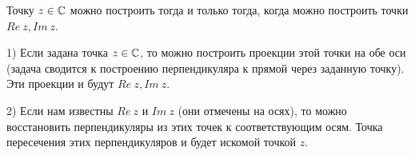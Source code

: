 Точку $z \in \mathbb{C}$ можно построить тогда и только тогда, когда можно построить точки $Re\ z, Im\ z$.

1) Если задана точка $z \in \mathbb{C}$, то можно построить проекции этой
точки на обе оси (задача сводится к построению перпендикуляра к прямой
через заданную точку). Эти проекции и будут $Re\ z, Im\ z$.

2) Если нам известны $Re\ z$ и $Im\ z$ (они отмечены на осях), то
можно восстановить перпендикуляры из этих точек к соответствующим осям.
Точка пересечения этих перпендикуляров и будет искомой точкой $z$.